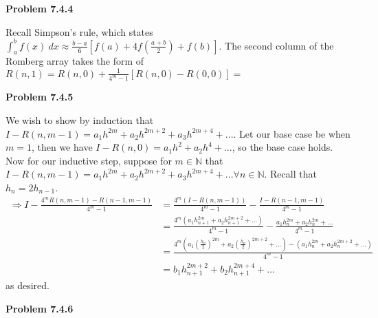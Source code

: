 \documentclass{article}
\def\N{\mathbb{N}}
\newcommand{\Problem}[1]{\textbf{Problem #1}}
\begin{document}
\Problem{7.4.4}

Recall Simpson's rule, which states $\displaystyle\int_a^b f(x)\ dx \approx \frac{b-a}{6}\left[f(a) + 4f\left(\frac{a+b}{2}\right) + f(b)\right]$. The second column of the Romberg array takes the form of $R(n,1) = R(n,0) + \frac{1}{4^m-1}[R(n,0) - R(0,0)] = $

\Problem{7.4.5}

We wish to show by induction that $I - R(n,m-1) = a_1h^{2m} + a_2h^{2m+2} + a_3h^{2m+4} + ...$. Let our base case be when $m = 1$, then we have $I - R(n,0) = a_1h^2 + a_2h^4 + ...$, so the base case holds. Now for our inductive step, suppose for $m \in \N$ that $I - R(n,m-1) = a_1h^{2m} + a_2h^{2m+2} + a_3h^{2m+4} + ... \forall n \in \N$. Recall that $h_n = 2h_{n-1}$.
\begin{align*}
	\Rightarrow I - \frac{4^mR(n,m-1)-R(n-1,m-1)}{4^m-1} &= \frac{4^m(I - R(n,m-1))}{4^m-1} - \frac{I - R(n-1,m-1)}{4^m-1}\\
	&= \frac{4^m(a_1h_{n+1}^{2m} + a_2h_{n+1}^{2m+2} + ...)}{4^m-1} - \frac{a_1h_{n}^{2m} + a_2h_{n}^{2m} + ...}{4^m-1}\\
	&= \frac{4^m(a_1(\frac{h_{n}}{2})^{2m} + a_2(\frac{h_{n}}{2})^{2m+2} + ...) - (a_1h_{n}^{2m} + a_2h_{n}^{2m+2}+ ...)}{4^m-1}\\
	&=b_1h_{n+1}^{2m+2} + b_2h_{n+1}^{2m+4} + ...
\end{align*}
as desired.

\Problem{7.4.6}
\end{document}
